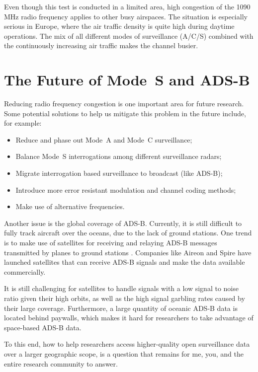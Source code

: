 Even though this test is conducted in a limited area, high congestion of the 1090 MHz radio frequency applies to other busy airspaces. The situation is especially serious in Europe, where the air traffic density is quite high during daytime operations. The mix of all different modes of surveillance (A/C/S) combined with the continuously increasing air traffic makes the channel busier.

\section{The Future of Mode~S and ADS-B}
Reducing radio frequency congestion is one important area for future research. Some potential solutions to help us mitigate this problem in the future include, for example:

\begin{itemize}
    \item Reduce and phase out Mode~A and Mode~C surveillance;
    \item Balance Mode~S interrogations among different surveillance radars;
    \item Migrate interrogation based surveillance to broadcast (like ADS-B);
    \item Introduce more error resistant modulation and channel coding methods;
    \item Make use of alternative frequencies.
\end{itemize}

Another issue is the global coverage of ADS-B. Currently, it is still difficult to fully track aircraft over the oceans, due to the lack of ground stations. One trend is to make use of satellites for receiving and relaying ADS-B messages transmitted by planes to ground stations \cite{noschese2011}. Companies like Aireon and Spire have launched satellites that can receive ADS-B signals and make the data available commercially. 

It is still challenging for satellites to handle signals with a low signal to noise ratio given their high orbits, as well as the high signal garbling rates caused by their large coverage. Furthermore, a large quantity of oceanic ADS-B data is located behind paywalls, which makes it hard for researchers to take advantage of space-based ADS-B data. 

To this end, how to help researchers access higher-quality open surveillance data over a larger geographic scope, is a question that remains for me, you, and the entire research community to answer.
